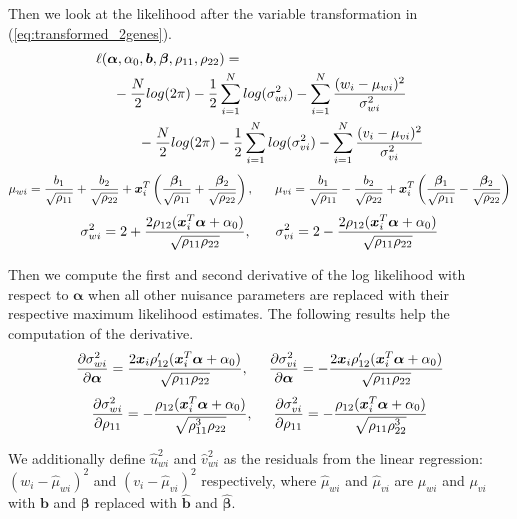 \documentclass[aoas,preprint]{imsart}
\numberwithin{equation}{section}
\theoremstyle{plain}
\begin{document}
Then we look at the likelihood after the variable transformation in (\ref{eq:transformed_2genes}).
\begin{equation}
\begin{multlined}
\ell(\bm{\alpha}, \alpha_0, \bm{b}, \bm{\beta}, \rho_{11}, \rho_{22}) = \\
-\frac{N}{2} log(2\pi) - \frac{1}{2} \sum_{i=1}^{N} log (\sigma_{wi}^2) - \sum_{i=1}^{N} \frac{(w_i - \mu_{wi})^2}{\sigma_{wi}^2}\\
\hspace{7mm} -\frac{N}{2} log(2\pi) - \frac{1}{2} \sum_{i=1}^{N} log (\sigma_{vi}^2) - \sum_{i=1}^{N} \frac{(v_i - \mu_{vi})^2}{\sigma_{vi}^2}
\end{multlined}
    \label{eq:likelihood_2genes_appendix}
\end{equation}
$$\mu_{wi} = \frac{{b}_1}{\sqrt{\rho_{11}}} + \frac{{b}_2}{\sqrt{\rho_{22}}} + \bm{x}_i^T \left(\frac{\bm{\beta}_1}{\sqrt{\rho_{11}}} + \frac{\bm{\beta}_2}{\sqrt{\rho_{22}}}\right), \hspace{6mm} 
\mu_{vi} = \frac{{b}_1}{\sqrt{\rho_{11}}} - \frac{{b}_2}{\sqrt{\rho_{22}}} + \bm{x}_i^T \left(\frac{\bm{\beta}_1}{\sqrt{\rho_{11}}} - \frac{\bm{\beta}_2}{\sqrt{\rho_{22}}}\right)$$
$$\sigma_{wi}^2 = 2 + \frac{2\rho_{12}(\bm{x}_i^T\bm{\alpha} + \alpha_0)}{\sqrt{\rho_{11}\rho_{22}}}, \hspace{6mm} \sigma_{vi}^2 = 2 - \frac{2\rho_{12}(\bm{x}_i^T\bm{\alpha} + \alpha_0)}{\sqrt{\rho_{11}\rho_{22}}}$$

Then we compute the first and second derivative of the log likelihood with respect to $\bm{\alpha}$ when all other nuisance parameters are replaced with their respective maximum likelihood estimates. The following results help the computation of the derivative.
$$
\frac{\partial \sigma_{wi}^2}{\partial \bm{\alpha}} = \frac{2\bm{x}_i \rho_{12}'(\bm{x}_i^T \bm{\alpha} + \alpha_0)}{\sqrt{\rho_{11}\rho_{22}}}, \hspace{5mm}
\frac{\partial \sigma_{vi}^2}{\partial \bm{\alpha}} = -\frac{2\bm{x}_i \rho_{12}'(\bm{x}_i^T \bm{\alpha} + \alpha_0)}{\sqrt{\rho_{11}\rho_{22}}}
$$
$$\frac{\partial \sigma_{wi}^2}{\partial \rho_{11}} = -\frac{\rho_{12}(\bm{x}_i^T\bm{\alpha} + \alpha_0)}{\sqrt{\rho_{11}^3\rho_{22}}}, \hspace{5mm}
\frac{\partial \sigma_{vi}^2}{\partial \rho_{11}} = -\frac{\rho_{12}(\bm{x}_i^T\bm{\alpha} + \alpha_0)}{\sqrt{\rho_{11}\rho_{22}^3}}$$

\noindent We additionally define $\hat{u}_{wi}^2$ and $\hat{v}_{wi}^2$ as the residuals from the linear regression: $(w_i - \hat{\mu}_{wi})^2$ and $(v_i-\hat{\mu}_{vi})^2$ respectively, where $\hat{\mu}_{wi}$ and $\hat{\mu}_{vi}$ are $\mu_{wi}$ and $\mu_{vi}$ with $\bm{b}$ and $\bm{\beta}$ replaced with $\hat{\bm{b}}$ and $\hat{\bm{\beta}}$.\\
\end{document}
